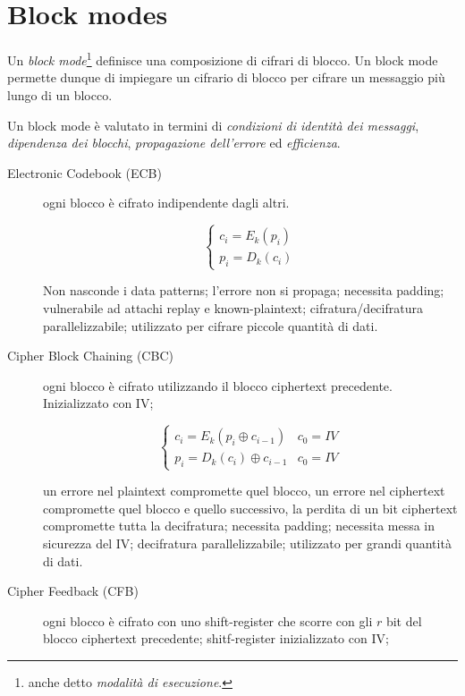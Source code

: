 \section{Block modes}
Un \textit{block mode}\footnote{anche detto \textit{modalità di esecuzione}.} definisce una composizione di cifrari di blocco. Un block mode permette dunque di impiegare un cifrario di blocco per cifrare un messaggio più lungo di un blocco.

Un block mode è valutato in termini di \textit{condizioni di identità dei messaggi}, \textit{dipendenza dei blocchi}, \textit{propagazione dell'errore} ed \textit{efficienza}.

\begin{description}
  \item[Electronic Codebook (ECB)] ogni blocco è cifrato indipendente dagli altri.

  \begin{equation}
  \begin{cases}
    c_{i}=E_{k}(p_{i}) \\
    p_{i}=D_{k}(c_{i})
  \end{cases}
  \end{equation}

  Non nasconde i data patterns; l'errore non si propaga; necessita padding; vulnerabile ad attachi replay e known-plaintext; cifratura/decifratura parallelizzabile; utilizzato per cifrare piccole quantità di dati.


  \item[Cipher Block Chaining (CBC)] ogni blocco è cifrato utilizzando il blocco ciphertext precedente. Inizializzato con IV;

  \begin{equation}
  \begin{cases}
    c_{i}=E_{k}(p_{i} \oplus c_{i-1}) & c_{0}=IV \\
    p_{i}=D_{k}(c_{i}) \oplus c_{i-1} & c_{0}=IV
  \end{cases}
  \end{equation}

   un errore nel plaintext compromette quel blocco, un errore nel ciphertext compromette quel blocco e quello successivo, la perdita di un bit ciphertext compromette tutta la decifratura; necessita padding; necessita messa in sicurezza del IV; decifratura parallelizzabile; utilizzato per grandi quantità di dati.


  \item[Cipher Feedback (CFB)] ogni blocco è cifrato con uno shift-register che scorre con gli $r$ bit del blocco ciphertext precedente; shitf-register inizializzato con IV;


\end{description}
